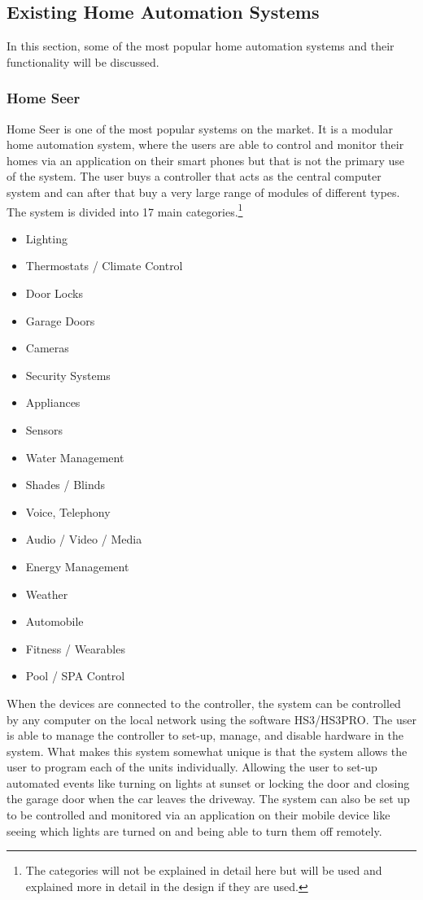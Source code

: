 \subsection{Existing Home Automation Systems}
\label{sub:existingSystems}
In this section, some of the most popular home automation systems and their functionality will be discussed.

\subsubsection{Home Seer}
Home Seer is one of the most popular systems on the market. It is a modular home automation system, where the users are able to control and monitor their homes via an application on their smart phones but that is not the primary use of the system. The user buys a controller that acts as the central computer system and can after that buy a very large range of modules of different types. The system is divided into 17 main categories.\footnote{The categories will not be explained in detail here but will be used and explained more in detail in the design if they are used.}
\begin{itemize}
	\item Lighting
	\item Thermostats / Climate Control
	\item Door Locks
	\item Garage Doors
	\item Cameras
	\item Security Systems
	\item Appliances
	\item Sensors
	\item Water Management
	\item Shades / Blinds
	\item Voice, Telephony
	\item Audio / Video / Media
	\item Energy Management
	\item Weather
	\item Automobile
	\item Fitness / Wearables
	\item Pool / SPA Control
\end{itemize}\cite{compatible_products}
When the devices are connected to the controller, the system can be controlled by any computer on the local network using the software HS3/HS3PRO. The user is able to manage the controller to set-up, manage, and disable hardware in the system. What makes this system somewhat unique is that the system allows the user to program each of the units individually. Allowing the user to set-up automated events like turning on lights at sunset or locking the door and closing the garage door when the car leaves the driveway. The system can also be set up to be controlled and monitored via an application on their mobile device like seeing which lights are turned on and being able to turn them off remotely\cite{quick_guide}.

